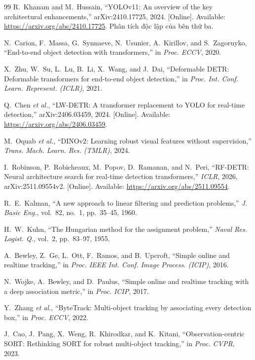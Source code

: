 \documentclass[fontsize=13pt,a4paper,oneside,parskip=false,numbers=noenddot,bibliography=totoc]{scrreprt}
\begin{document}
\begin{thebibliography}{99}
R.~Khanam and M.~Hussain, ``YOLOv11: An overview of the key architectural enhancements,'' arXiv:2410.17725, 2024. [Online]. Available: \url{https://arxiv.org/abs/2410.17725}. Phân tích độc lập của bên thứ ba.

N.~Carion, F.~Massa, G.~Synnaeve, N.~Usunier, A.~Kirillov, and S.~Zagoruyko, ``End-to-end object detection with transformers,'' in \textit{Proc. ECCV}, 2020.

X.~Zhu, W.~Su, L.~Lu, B.~Li, X.~Wang, and J.~Dai, ``Deformable DETR: Deformable transformers for end-to-end object detection,'' in \textit{Proc. Int. Conf. Learn. Represent. (ICLR)}, 2021.

Q.~Chen \textit{et al.}, ``LW-DETR: A transformer replacement to YOLO for real-time detection,'' arXiv:2406.03459, 2024. [Online]. Available: \url{https://arxiv.org/abs/2406.03459}.

M.~Oquab \textit{et al.}, ``DINOv2: Learning robust visual features without supervision,'' \textit{Trans. Mach. Learn. Res. (TMLR)}, 2024.

I.~Robinson, P.~Robicheaux, M.~Popov, D.~Ramanan, and N.~Peri, ``RF-DETR: Neural architecture search for real-time detection transformers,'' \textit{ICLR}, 2026, arXiv:2511.09554v2. [Online]. Available: \url{https://arxiv.org/abs/2511.09554}.

R.~E.~Kalman, ``A new approach to linear filtering and prediction problems,'' \textit{J. Basic Eng.}, vol.~82, no.~1, pp.~35--45, 1960.

H.~W.~Kuhn, ``The Hungarian method for the assignment problem,'' \textit{Naval Res. Logist. Q.}, vol.~2, pp.~83--97, 1955.

A.~Bewley, Z.~Ge, L.~Ott, F.~Ramos, and B.~Upcroft, ``Simple online and realtime tracking,'' in \textit{Proc. IEEE Int. Conf. Image Process. (ICIP)}, 2016.

N.~Wojke, A.~Bewley, and D.~Paulus, ``Simple online and realtime tracking with a deep association metric,'' in \textit{Proc. ICIP}, 2017.

Y.~Zhang \textit{et al.}, ``ByteTrack: Multi-object tracking by associating every detection box,'' in \textit{Proc. ECCV}, 2022.

J.~Cao, J.~Pang, X.~Weng, R.~Khirodkar, and K.~Kitani, ``Observation-centric SORT: Rethinking SORT for robust multi-object tracking,'' in \textit{Proc. CVPR}, 2023.


\end{thebibliography}
\end{document}
